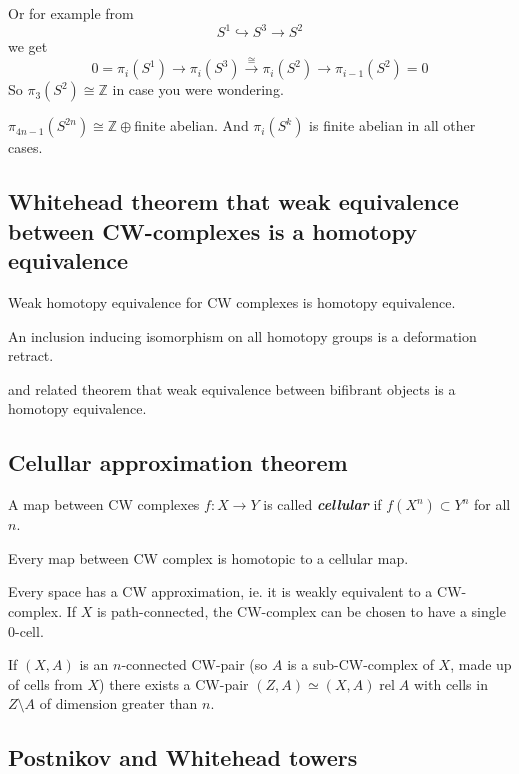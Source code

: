 Or for example from
\[S^1\hookrightarrow S^3\to S^2\]
we get
\[0=\pi_i(S^1)\to \pi_i(S^3)\overset{\cong}{\to}\pi_i(S^2)\to\pi_{i-1}(S^2)=0\]
So $\pi_3(S^2)\cong\mathbb{Z}$ in case you were wondering.
\begin{claim}[Serre]
	$\pi_{4n-1}(S^{2n})\cong\mathbb{Z}\oplus$finite abelian. And $\pi_i(S^k)$ is finite abelian in all other cases.
\end{claim}

\subsection{Whitehead theorem that weak equivalence between CW-complexes is a homotopy equivalence}

\begin{thm}[Whitehead]
	Weak homotopy equivalence for CW complexes is homotopy equivalence.

	An inclusion inducing isomorphism on all homotopy groups is a deformation retract.
\end{thm}


and related theorem that weak equivalence between bifibrant objects is a homotopy equivalence.
\subsection{Celullar approximation theorem}

\begin{defn}
	A map between CW complexes $f:X\to Y$ is called \textit{\textbf{cellular}} if $f(X^{n})\subset Y^{n}$ for all $n$.
\end{defn}
\begin{thm}
	Every map between CW complex is homotopic to a cellular map.
\end{thm}
\begin{thm}[CW approximation]
	Every space has a CW approximation, ie. it is weakly equivalent to a CW-complex.	
	If $X$ is path-connected, the CW-complex can be chosen to have a single 0-cell.

	If $(X,A)$ is an $n$-connected CW-pair (so $A$ is a sub-CW-complex of $X$, made up of cells from $X$) there exists a CW-pair $(Z,A)\simeq (X,A)\operatorname{rel}A$ with cells in $Z\setminus A$ of dimension greater than $n$.
\end{thm}

\subsection{Postnikov and Whitehead towers}

